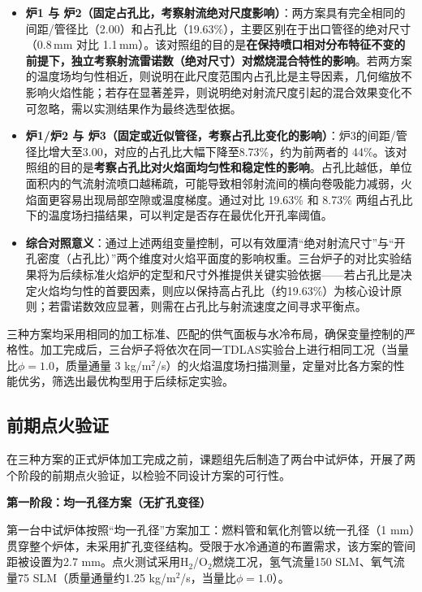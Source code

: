 \begin{itemize}
	\item \textbf{炉1 与 炉2（固定占孔比，考察射流绝对尺度影响）}：两方案具有完全相同的间距/管径比（2.00）和占孔比（19.63\%），主要区别在于出口管径的绝对尺寸（0.8\,mm 对比 1.1\,mm）。该对照组的目的是\textbf{在保持喷口相对分布特征不变的前提下，独立考察射流雷诺数（绝对尺寸）对燃烧混合特性的影响}。若两方案的温度场均匀性相近，则说明在此尺度范围内占孔比是主导因素，几何缩放不影响火焰性能；若存在显著差异，则说明绝对射流尺度引起的混合效果变化不可忽略，需以实测结果作为最终选型依据。
	
	\item \textbf{炉1/炉2 与 炉3（固定或近似管径，考察占孔比变化的影响）}：炉3的间距/管径比增大至3.00，对应的占孔比大幅下降至8.73\%，约为前两者的 44\%。该对照组的目的是\textbf{考察占孔比对火焰面均匀性和稳定性的影响}。占孔比越低，单位面积内的气流射流喷口越稀疏，可能导致相邻射流间的横向卷吸能力减弱，火焰面更容易出现局部空隙或温度梯度。通过对比 19.63\% 和 8.73\% 两组占孔比下的温度场扫描结果，可以判定是否存在最优化开孔率阈值。
	
	\item \textbf{综合对照意义}：通过上述两组变量控制，可以有效厘清“绝对射流尺寸”与“开孔密度（占孔比）”两个维度对火焰平面度的影响权重。三台炉子的对比实验结果将为后续标准火焰炉的定型和尺寸外推提供关键实验依据——若占孔比是决定火焰均匀性的首要因素，则应以保持高占孔比（约19.63\%）为核心设计原则；若雷诺数效应显著，则需在占孔比与射流速度之间寻求平衡点。
\end{itemize}

三种方案均采用相同的加工标准、匹配的供气面板与水冷布局，确保变量控制的严格性。加工完成后，三台炉子将依次在同一TDLAS实验台上进行相同工况（当量比\(\phi=1.0\)，质量通量 3 kg/m\(^2\)/s）的火焰温度场扫描测量，定量对比各方案的性能优劣，筛选出最优构型用于后续标定实验。
\subsection{前期点火验证}

在三种方案的正式炉体加工完成之前，课题组先后制造了两台中试炉体，开展了两个阶段的前期点火验证，以检验不同设计方案的可行性。

\textbf{第一阶段：均一孔径方案（无扩孔变径）}

第一台中试炉体按照“均一孔径”方案加工：燃料管和氧化剂管以统一孔径（1 mm）贯穿整个炉体，未采用扩孔变径结构。受限于水冷通道的布置需求，该方案的管间距被设置为2.7 mm。点火测试采用H$_2$/O$_2$燃烧工况，氢气流量150 SLM、氧气流量75 SLM（质量通量约1.25 kg/m$^2$/s，当量比$\phi = 1.0$）。

